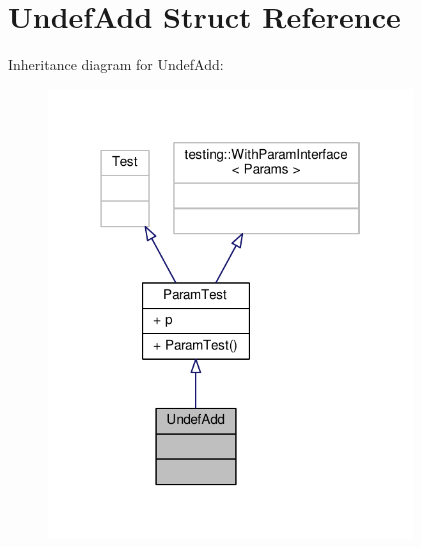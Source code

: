 \hypertarget{struct_undef_add}{}\section{Undef\+Add Struct Reference}
\label{struct_undef_add}


Inheritance diagram for Undef\+Add\+:
\nopagebreak
\begin{figure}[H]
\begin{center}
\leavevmode
\includegraphics[width=274pt]{struct_undef_add__inherit__graph}
\end{center}
\end{figure}


